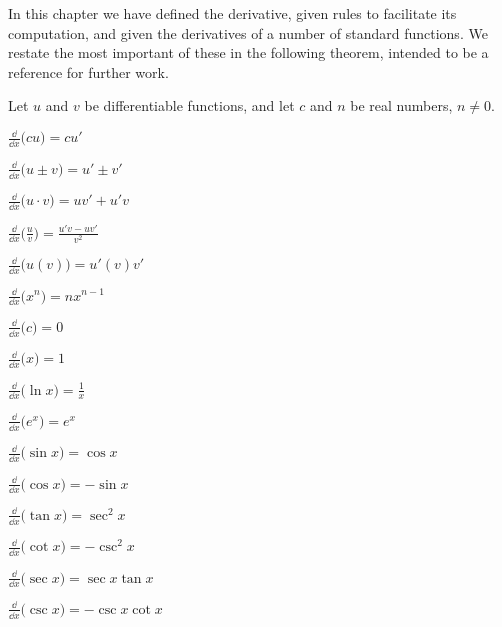 

In this chapter we have defined the derivative, given rules to facilitate its computation, and given the derivatives of a number of standard functions. We restate the most important of these in the following theorem, intended to be a reference for further work.

\begin{theorem}\label{thm:deriv_glossary}%
Let $u$ and $v$ be differentiable functions, and let $c$ and $n$ be real numbers, $n\neq 0$.
\begin{enumext*}[columns=2, widest=10]
	\item		$\frac{\dd}{\dd x}\bigl(cu\bigr) = cu'$
	\item		$\frac{\dd}{\dd x}\bigl(u\pm v\bigr) = u'\pm v'$
	\item		$\frac{\dd}{\dd x}\bigl(u\cdot v\bigr) = uv'+u'v$
	\item		$\frac{\dd}{\dd x}\bigl(\frac uv\bigr) = \frac{u'v-uv'}{v^2}$
	\item		$\frac{\dd}{\dd x}\bigl(u(v)\bigr) = u'(v)v'$
	\item		$\frac{\dd}{\dd x}\bigl(x^n\bigr) = nx^{n-1}$
	\item		$\frac{\dd}{\dd x}\bigl(c\bigr) = 0$
	\item		$\frac{\dd}{\dd x}\bigl(x\bigr) = 1$
	\item		$\frac{\dd}{\dd x}\bigl(\ln x\bigr) = \frac{1}{x}$
	\item		$\frac{\dd}{\dd x}\bigl(e^x\bigr) = e^x$
	\item		$\frac{\dd}{\dd x}\bigl(\sin x\bigr) = \cos x$
	\item		$\frac{\dd}{\dd x}\bigl(\cos x\bigr) = -\sin x$
	\item		$\frac{\dd}{\dd x}\bigl(\tan x\bigr) = \sec^2x$
	\item		$\frac{\dd}{\dd x}\bigl(\cot x\bigr) = -\csc^2x$
	\item		$\frac{\dd}{\dd x}\bigl(\sec x\bigr) = \sec x\tan x$
	\item		$\frac{\dd}{\dd x}\bigl(\csc x\bigr) = -\csc x\cot x$
\end{enumext*}
\end{theorem}

